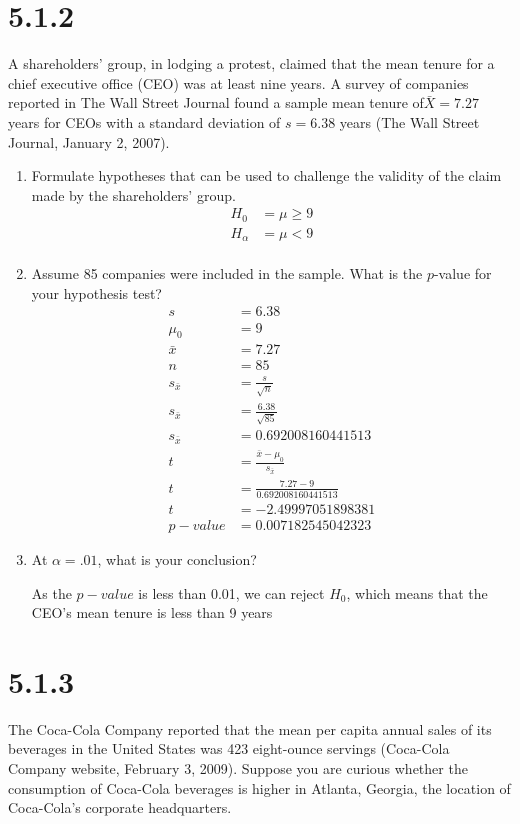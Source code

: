 \documentclass{article}
\begin{document}
\section*{5.1.2}
A shareholders’ group, in lodging a protest, claimed that the mean tenure for a chief executive office (CEO) was at least nine years. A survey of companies reported in The Wall Street Journal found a sample mean tenure of$\bar{X} = 7.27$ years for CEOs with a standard deviation of $s = 6.38$ years (The Wall Street Journal, January 2, 2007).
\begin{enumerate}
  \item Formulate hypotheses that can be used to challenge the validity of the claim made by the shareholders’ group.
  \begin{align*}
    H_{0} &= \mu \geq 9\\
    H_{\alpha} &= \mu < 9 \\
  \end{align*}

  \item Assume 85 companies were included in the sample. What is the $p$-value for your hypothesis test?
  \begin{align*}
    s &= 6.38\\
    \mu_{0} &= 9\\
    \bar{x} &= 7.27\\
    n &= 85\\
    s_{\bar{x}} &= \frac{s}{\sqrt{n}}\\
    s_{\bar{x}} &= \frac{6.38}{\sqrt{85}}\\
    s_{\bar{x}} &= 0.692008160441513\\
    t &= \frac{\bar{x} - \mu_{0}}{s_{\bar{x}}}\\
    t &= \frac{7.27 - 9}{0.692008160441513}\\
    t &= -2.49997051898381\\
    p-value &= 0.007182545042323
  \end{align*}

  \item At $\alpha = .01$, what is your conclusion?

  As the $p-value$ is less than 0.01, we can reject $H_{0}$, which means that the CEO's mean tenure is less than 9 years

\end{enumerate}
\pagebreak

\section*{5.1.3}
The Coca-Cola Company reported that the mean per capita annual sales of its beverages in the United States was 423 eight-ounce servings (Coca-Cola Company website, February 3, 2009). Suppose you are curious whether the consumption of Coca-Cola beverages is higher in Atlanta, Georgia, the location of Coca-Cola’s corporate headquarters.
\end{document}
